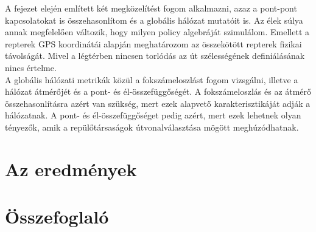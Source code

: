     A fejezet elején említett két megközelítést fogom alkalmazni, azaz a pont-pont kapcsolatokat is összehasonlítom és a globális hálózat mutatóit is. Az élek súlya annak megfelelően változik, hogy milyen policy algebráját szimulálom. Emellett a repterek GPS koordinátái alapján meghatározom az összekötött repterek fizikai távolságát. Mivel a légtérben nincsen torlódás az út szélességének definiálásának nincs értelme.\\

    A globális hálózati metrikák közül a fokszámeloszlást fogom vizsgálni, illetve a hálózat átmérőjét és a pont- és él-összefüggőségét. A fokszámeloszlás és az átmérő összehasonlításra azért van szükség, mert ezek alapvető karakterisztikáját adják a hálózatnak. A pont- és él-összefüggőséget pedig azért, mert ezek lehetnek olyan tényezők, amik a repülőtársaságok útvonalválasztása mögött meghúzódhatnak.
    
  \section{Az eredmények}

  \section{Összefoglaló}
